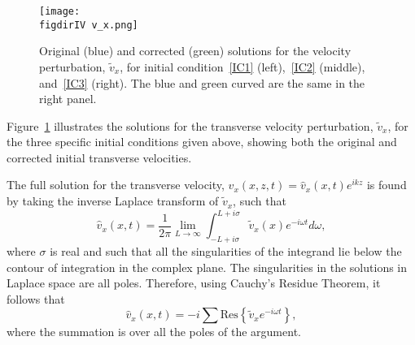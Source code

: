 %
\begin{figure}
	\texttt{[image: \\figdirIV v\_x.png]}
	\caption{Original \cite{rae_etal81} (blue) and corrected (green) solutions for the velocity perturbation, $\tilde{v}_x$, for initial condition~\ref{IC1} (left),~\ref{IC2} (middle), and~\ref{IC3} (right). The blue and green curved are the same in the right panel.}
	\label{fig: vx}
\end{figure}
Figure~\ref{fig: vx} illustrates the solutions for the transverse velocity perturbation, $\tilde{v}_x$, for the three specific initial conditions given above, showing both the original and corrected initial transverse velocities.

The full solution for the transverse velocity, $v_x(x, z, t) = \widehat{v}_x(x,t)e^{ikz}$ is found by taking the inverse Laplace transform of $\tilde{v}_x$, such that
\begin{equation}
\widehat{v}_x(x,t) = \frac{1}{2\pi} \lim_{L \to \infty} \int_{-L + i\sigma}^{L + i\sigma} \tilde{v}_x(x)e^{-i\omega t} d\omega,
\end{equation}
where $\sigma$ is real and such that all the singularities of the integrand lie below the contour of integration in the complex plane. The singularities in the solutions in Laplace space are all poles. Therefore, using Cauchy's Residue Theorem, it follows that
\begin{equation}
\widehat{v}_x(x, t) = -i\sum \mathrm{Res}\left\{\tilde{v}_xe^{-i\omega t}\right\},
\end{equation}
where the summation is over all the poles of the argument.

